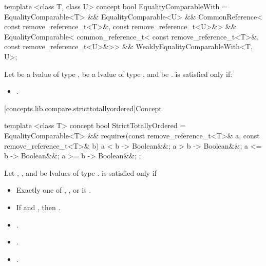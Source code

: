 %
\begin{itemdecl}
template <class T, class U>
concept bool EqualityComparableWith =
  EqualityComparable<T> &&
  EqualityComparable<U> &&
  CommonReference<
    const remove_reference_t<T>&,
    const remove_reference_t<U>&> &&
  EqualityComparable<
    common_reference_t<
      const remove_reference_t<T>&,
      const remove_reference_t<U>&>> &&
  WeaklyEqualityComparableWith<T, U>;
\end{itemdecl}

\begin{itemdescr}
\pnum
Let  be a  lvalue of type ,  be a
 lvalue of type , and  be
.
 is satisfied only if:

\begin{itemize}
\item {}.
\end{itemize}
\end{itemdescr}

[concepts.lib.compare.stricttotallyordered]{Concept }

%
\begin{itemdecl}
template <class T>
concept bool StrictTotallyOrdered =
  EqualityComparable<T> &&
  requires(const remove_reference_t<T>& a,
           const remove_reference_t<T>& b) {
    { a < b }  -> Boolean&&;
    { a > b }  -> Boolean&&;
    { a <= b } -> Boolean&&;
    { a >= b } -> Boolean&&;
  };
\end{itemdecl}

\begin{itemdescr}
\pnum
Let , , and  be  lvalues of type .
 is satisfied only if

\begin{itemize}
\item Exactly one of , , or
       is .
\item If  and , then
      .
\item {}.
\item {}.
\item {}.
\end{itemize}

\end{itemdescr}

